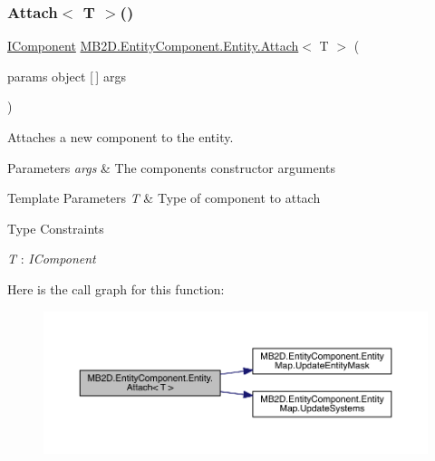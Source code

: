 \subsubsection{\texorpdfstring{Attach$<$ T $>$()}{Attach< T >()}}
{\footnotesize\ttfamily \hyperlink{interface_m_b2_d_1_1_entity_component_1_1_i_component}{I\+Component} \hyperlink{class_m_b2_d_1_1_entity_component_1_1_entity_aa86d1be62df6d89b981d1000c856a306}{M\+B2\+D.\+Entity\+Component.\+Entity.\+Attach}$<$ T $>$ (\begin{DoxyParamCaption}\item[{params object \mbox{[}$\,$\mbox{]}}]{args }\end{DoxyParamCaption})\hspace{0.3cm}{\ttfamily [inline]}}



Attaches a new component to the entity. 


\begin{DoxyParams}{Parameters}
{\em args} & The components constructor arguments\\
\hline
\end{DoxyParams}

\begin{DoxyTemplParams}{Template Parameters}
{\em T} & Type of component to attach\\
\hline
\end{DoxyTemplParams}
\begin{Desc}
\item[Type Constraints]\begin{description}
\item[{\em T} : {\em I\+Component}]\end{description}
\end{Desc}
Here is the call graph for this function\+:
\nopagebreak
\begin{figure}[H]
\begin{center}
\leavevmode
\includegraphics[width=350pt]{class_m_b2_d_1_1_entity_component_1_1_entity_a53ffea8d43423903712540fc2df6b82d_cgraph}
\end{center}
\end{figure}
\hypertarget{class_m_b2_d_1_1_entity_component_1_1_entity_a9194f3b1f3370d2ecb47efe077ba4050}{}\label{class_m_b2_d_1_1_entity_component_1_1_entity_a9194f3b1f3370d2ecb47efe077ba4050} 
